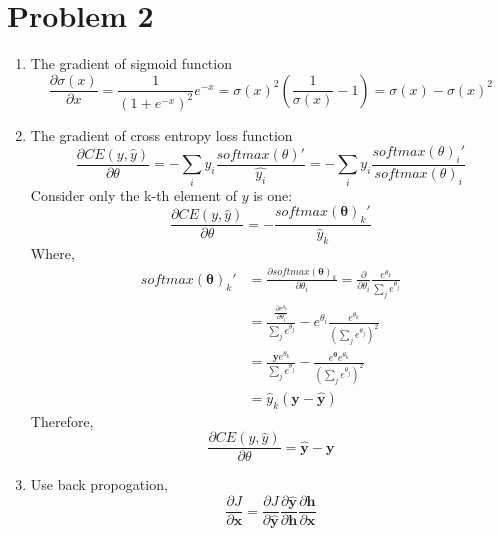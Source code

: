 \documentclass[10pt]{article}
\begin{document}
\section*{Problem 2}
\begin{enumerate}[label=(\alph*)]
\item
The gradient of sigmoid function
\begin{equation*}
	\frac{\partial\sigma(x)}{\partial x} = \frac{1}{(1+e^{-x})^2}e^{-x} = \sigma(x)^2(\frac{1}{\sigma(x)}-1) = \sigma(x) - \sigma(x)^2
\end{equation*}
\item
The gradient of cross entropy loss function
\begin{equation*}
	\frac{\partial CE(y,\hat{y})}{\partial\theta} = -\sum_{i}y_{i}\frac{softmax(\theta)'}{\hat{y_{i}}} = -\sum_{i}y_{i}\frac{softmax(\theta)_i'}{softmax(\theta)_i}
\end{equation*}
Consider only the k-th element of $y$ is one:
\begin{equation*}
	\frac{\partial CE(y,\hat{y})}{\partial\theta} = - \frac{softmax(\mathbf{\theta})_k'}{\hat{y}_k}
\end{equation*}
Where,
\begin{equation*}
	\begin{aligned}
	softmax(\mathbf{\theta})_k' & = \frac{\partial softmax(\mathbf{\theta})_k}{\partial\theta_i} = \frac{\partial}{\partial\theta_i}\frac{e^{\theta_{k}}}{\sum_{j}e^{\theta_j}}\\
					 & = \frac{\frac{\partial e^{\theta_k}}{\partial \theta_i}}{\sum_{j}e^{\theta_j}} - e^{\theta_i}\frac{e^{\theta_k}}{(\sum_{j}e^{\theta_j})^2}\\
					 & = \frac{\mathbf{y}e^{\theta_k}}{\sum_{j}e^{\theta_j}} - \frac{e^{\mathbf{\theta}}e^{\theta_k}}{(\sum_{j}e^{\theta_j})^2}\\
					 & = \hat{y}_k(\mathbf{y}-\mathbf{\hat{y}})
	\end{aligned}
\end{equation*}
Therefore,
\begin{equation*}
	\frac{\partial CE(y,\hat{y})}{\partial\theta} = \mathbf{\hat{y}} - \mathbf{y}
\end{equation*}
\item
Use back propogation, 
\begin{equation*}
	\frac{\partial J}{\partial \mathbf{x}} = \frac{\partial J}{\partial \mathbf{\hat{y}}}\frac{\partial \mathbf{\hat{y}}}{\partial \mathbf{h}}\frac{{\partial \mathbf{h}}}{\partial \mathbf{x}}
\end{equation*}

\end{enumerate}
\end{document}
